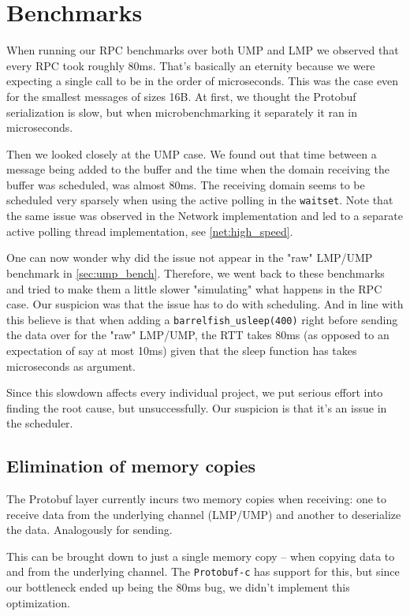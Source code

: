 \section{Benchmarks}
When running our RPC benchmarks over both UMP and LMP we observed that every RPC took roughly 80ms. That's basically an eternity because we were expecting a single call to be in the order of microseconds. This was the case even for the smallest messages of sizes 16B. At first, we thought the Protobuf serialization is slow, but when microbenchmarking it separately it ran in microseconds.

Then we looked closely at the UMP case. We found out that time between a message being added to the buffer and the time when the domain receiving the buffer was scheduled, was almost 80ms. The receiving domain seems to be scheduled very sparsely when using the active polling in the \texttt{waitset}. Note that  the same issue was observed in the Network implementation and led to a separate active polling thread implementation, see \autoref{net:high_speed}.

One can now wonder why did the issue not appear in the "raw" LMP/UMP benchmark in \autoref{sec:ump_bench}. Therefore, we went back to these benchmarks and tried to make them a little slower "simulating" what happens in the RPC case. Our suspicion was that the issue has to do with scheduling. And in line with this believe is that when adding a \texttt{barrelfish_usleep(400)} right before sending the data over for the "raw" LMP/UMP, the RTT takes 80ms (as opposed to an expectation of say at most 10ms) given that the sleep function has takes microseconds as argument. 

Since this slowdown affects every individual project, we put serious effort into finding the root cause, but unsuccessfully. Our suspicion is that it's an issue in the scheduler.

\subsection{Elimination of memory copies}
\label{sec:rpc_proto_opt}
The Protobuf layer currently incurs two memory copies when receiving: one to receive data from the underlying channel (LMP/UMP) and another to deserialize the data. Analogously for sending.

This can be brought down to just a single memory copy -- when copying data to and from the underlying channel. The \texttt{Protobuf-c} has support for this, but since our bottleneck ended up being the 80ms bug, we didn't implement this optimization. 

